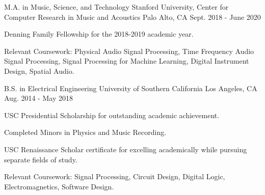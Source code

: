 

\begin{cventries}

    \cventry
    {M.A. in Music, Science, and Technology} %
    {Stanford University, Center for Computer Research in Music and Acoustics} %
    {Palo Alto, CA} %
    {Sept. 2018 - June 2020} %
    {
      \begin{cvitems} %
        \item {Denning Family Fellowship for the 2018-2019 academic year.}
        \item {Relevant Coursework: Physical Audio Signal Processing, Time Frequency Audio Signal Processing,
               Signal Processing for Machine Learning, Digital Instrument Design, Spatial Audio.}
      \end{cvitems}
    }

    \cventry
    {B.S. in Electrical Engineering} %
    {University of Southern California} %
    {Los Angeles, CA} %
    {Aug. 2014 - May 2018} %
    {
      \begin{cvitems} %
        \item {USC Presidential Scholarship for outstanding academic achievement.}
        \item {Completed Minors in Physics and Music Recording.}
        \item {USC Renaissance Scholar certificate for excelling academically while pursuing separate fields of study.}
        \item {Relevant Coursework: Signal Processing, Circuit Design, Digital Logic, Electromagnetics, Software Design.}
      \end{cvitems}
    }

\end{cventries}
